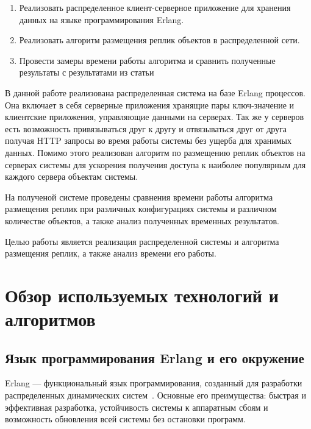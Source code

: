 





\Task
	\begin{enumerate}
		\item Реализовать распределенное клиент-серверное приложение 
		для хранения данных на языке программирования Erlang.
		
		\item Реализовать алгоритм размещения реплик объектов в 
		распределенной сети.
		
		\item Провести замеры времени работы алгоритма и сравнить 
		полученные результаты с результатами из статьи 
	\end{enumerate}
\newpage

\tableofcontents
\newpage

\Intro
	В данной работе реализована распределенная система на базе Erlang процессов. Она включает в себя серверные приложения хранящие пары ключ-значение и клиентские приложения,
	управляющие данными на серверах. Так же у серверов есть возможность привязываться друг к другу и отвязываться друг от друга получая HTTP запросы во время работы системы без ущерба для
	хранимых данных. Помимо этого реализован алгоритм по размещению реплик объектов на серверах системы для ускорения получения доступа к наиболее популярным для каждого сервера
	объектам системы.
	
	На полученой системе проведены сравнения времени работы алгоритма размещения реплик при различных конфигурациях системы и различном количестве объектов, а также анализ полученных 
	временных результатов.
	
	Целью работы является реализация распределенной системы и алгоритма размещения реплик, а также анализ времени его работы.
\newpage

\chapter{Обзор используемых технологий и алгоритмов}
	\section{Язык программирования Erlang и его окружение}
		Erlang --- функциональный язык программирования, созданный для разработки	распределенных динамических систем~\cite{erl}.
		Основные его преимущества: быстрая и эффективная разработка, устойчивость системы к аппаратным сбоям и 
		возможность обновления всей системы без остановки программ.

